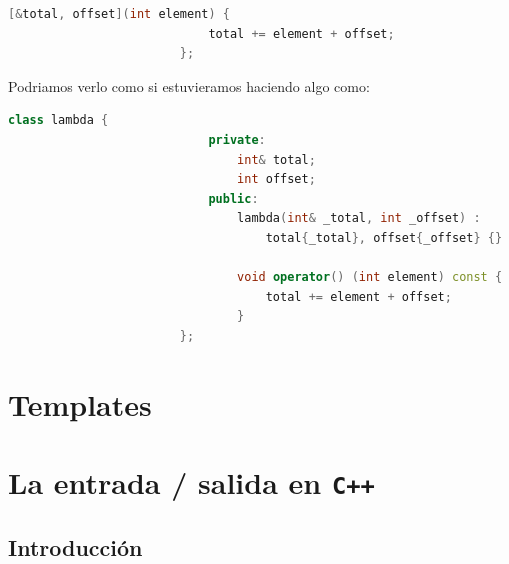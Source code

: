 \documentclass[12pt, fleqn]{report}                             %
\theoremstyle{break}                                            %
\newcommand{\textCode}[1]  { \texttt{#1} }                      %
\newcommand{\Cpp}{\ignorespaces\textCode{C++}}                  %
\begin{document}
                    \begin{lstlisting}[language=C++, gobble=24]
                        [&total, offset](int element) { 
                            total += element + offset;
                        };
                    \end{lstlisting}

                    Podriamos verlo como si estuvieramos haciendo algo como:
                    \begin{lstlisting}[language=C++, gobble=24]
                        class lambda {
                            private:
                                int& total;
                                int offset;
                            public: 
                                lambda(int& _total, int _offset) : 
                                    total{_total}, offset{_offset} {}

                                void operator() (int element) const { 
                                    total += element + offset;
                                }
                        };
                    \end{lstlisting}

                    \cite{shaharmikeLambdas}


        \clearpage
        \section{Templates}



        \clearpage
        \section{La entrada / salida en \Cpp}

            \subsection{Introducción}
\end{document}
